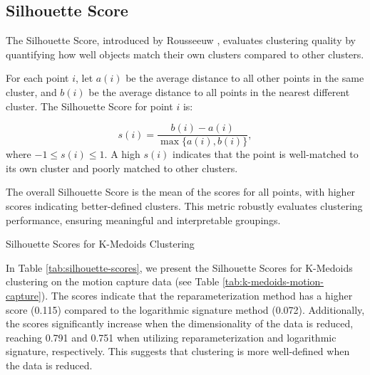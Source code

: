 \FloatBarrier
\subsection{Silhouette Score}
\label{subsec:silhouette-score}

The Silhouette Score, introduced by Rousseeuw \cite{rousseeuwRousseeuwSilhouettesGraphical1987}, evaluates clustering quality by quantifying how well objects match their own clusters compared to other clusters.

For each point \( i \), let \( a(i) \) be the average distance to all other points in the same cluster, and \( b(i) \) be the average distance to all points in the nearest different cluster. The Silhouette Score for point \( i \) is:

\begin{equation}
    s(i) = \frac{b(i) - a(i)}{\max\{a(i), b(i)\}},
    \label{eq:silhouette-score}
\end{equation}
where \( -1 \leq s(i) \leq 1 \). A high \( s(i) \) indicates that the point is well-matched to its own cluster and poorly matched to other clusters.

The overall Silhouette Score is the mean of the scores for all points, with higher scores indicating better-defined clusters. This metric robustly evaluates clustering performance, ensuring meaningful and interpretable groupings.

\begin{table}[h]
    \centering
    
    \caption{Silhouette Scores for K-Medoids Clustering}
    \label{tab:silhouette-scores}
\end{table}

In Table \ref{tab:silhouette-scores}, we present the Silhouette Scores for K-Medoids clustering on the motion capture data (see Table \ref{tab:k-medoids-motion-capture}). The scores indicate that the reparameterization method has a higher score (0.115) compared to the logarithmic signature method (0.072). Additionally, the scores significantly increase when the dimensionality of the data is reduced, reaching 0.791 and 0.751 when utilizing reparameterization and logarithmic signature, respectively. This suggests that clustering is more well-defined when the data is reduced.